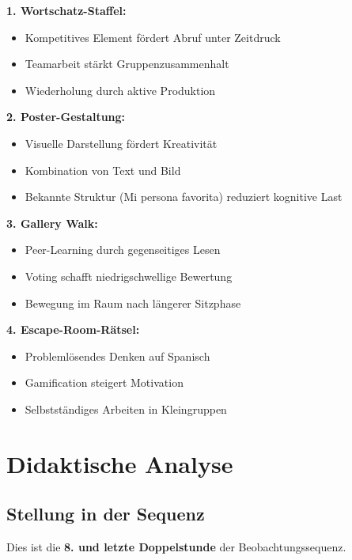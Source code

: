 \documentclass[11pt,a4paper]{article}
\begin{document}
\textbf{1. Wortschatz-Staffel:}
\begin{itemize}
    \item Kompetitives Element fördert Abruf unter Zeitdruck
    \item Teamarbeit stärkt Gruppenzusammenhalt
    \item Wiederholung durch aktive Produktion
\end{itemize}

\textbf{2. Poster-Gestaltung:}
\begin{itemize}
    \item Visuelle Darstellung fördert Kreativität
    \item Kombination von Text und Bild
    \item Bekannte Struktur (\glqq{}Mi persona favorita\grqq{}) reduziert kognitive Last
\end{itemize}

\textbf{3. Gallery Walk:}
\begin{itemize}
    \item Peer-Learning durch gegenseitiges Lesen
    \item Voting schafft niedrigschwellige Bewertung
    \item Bewegung im Raum nach längerer Sitzphase
\end{itemize}

\textbf{4. Escape-Room-Rätsel:}
\begin{itemize}
    \item Problemlösendes Denken auf Spanisch
    \item Gamification steigert Motivation
    \item Selbstständiges Arbeiten in Kleingruppen
\end{itemize}

\section{Didaktische Analyse}

\subsection{Stellung in der Sequenz}

Dies ist die \textbf{8. und letzte Doppelstunde} der Beobachtungssequenz.
\end{document}
